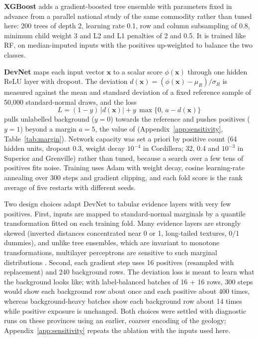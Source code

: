 \documentclass[pdflatex,sn-apa]{sn-jnl}
\begin{document}
\textbf{XGBoost} \citep{Chen2016} adds a gradient-boosted tree ensemble with parameters fixed in advance from a parallel national study of the same commodity rather than tuned here: 200 trees of depth 2, learning rate 0.1, row and column subsampling of 0.8, minimum child weight 3 and L2 and L1 penalties of 2 and 0.5. It is trained like RF, on median-imputed inputs with the positives up-weighted to balance the two classes.

\textbf{DevNet} \citep{Pang2019} maps each input vector $\mathbf{x}$ to a scalar score $\phi(\mathbf{x})$ through one hidden ReLU layer with dropout. The deviation $d(\mathbf{x}) = (\phi(\mathbf{x}) - \mu_R)/\sigma_R$ is measured against the mean and standard deviation of a fixed reference sample of 50,000 standard-normal draws, and the loss
\begin{equation}
L = (1-y)\,|d(\mathbf{x})| + y\,\max\{0,\, a - d(\mathbf{x})\}
\end{equation}
pulls unlabelled background ($y=0$) towards the reference and pushes positives ($y=1$) beyond a margin $a = 5$, the value of \citet{Pang2019} (Appendix~\ref{app:sensitivity}, Table~\ref{tab:margin}). Network capacity was set a priori by positive count (64 hidden units, dropout 0.3, weight decay $10^{-4}$ in Cordillera; 32, 0.4 and $10^{-3}$ in Superior and Grenville) rather than tuned, because a search over a few tens of positives fits noise. Training uses Adam \citep{Kingma2014} with weight decay, cosine learning-rate annealing over 300 steps and gradient clipping, and each fold score is the rank average of five restarts with different seeds.

Two design choices adapt DevNet to tabular evidence layers with very few positives. First, inputs are mapped to standard-normal marginals by a quantile transformation fitted on each training fold. Many evidence layers are strongly skewed (inverted distances concentrated near 0 or 1, long-tailed textures, 0/1 dummies), and unlike tree ensembles, which are invariant to monotone transformations, multilayer perceptrons are sensitive to such marginal distributions \citep{Gorishniy2021,Grinsztajn2022}. Second, each gradient step uses 16 positives (resampled with replacement) and 240 background rows. The deviation loss is meant to learn what the background looks like; with label-balanced batches of 16 + 16 rows, 300 steps would show each background row about once and each positive about 400 times, whereas background-heavy batches show each background row about 14 times while positive exposure is unchanged. Both choices were settled with diagnostic runs on these provinces using an earlier, coarser encoding of the geology; Appendix~\ref{app:sensitivity} repeats the ablation with the inputs used here.
\end{document}

